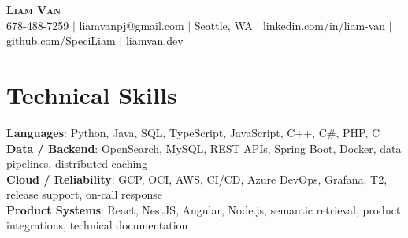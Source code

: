 \documentclass[letterpaper,11pt]{article}
\begin{document}

%
\begin{center}
    \textbf{\Huge \scshape Liam Van} \\ \vspace{1pt}
    \small 678-488-7259 $|$ \small {liamvanpj@gmail.com} $|$ Seattle, WA
 {{$|$ linkedin.com/in/liam-van} {$|$ github.com/SpeciLiam} {$|$ \href{https://liamvan.dev}{liamvan.dev}}}

\end{center}

\section{Technical Skills}
 \begin{itemize}[leftmargin=0.15in, label={}]
    \small{\item{
     \textbf{Languages}{: Python, Java, SQL, TypeScript, JavaScript, C++, C\#, PHP, C} \\
     \textbf{Data / Backend}{: OpenSearch, MySQL, REST APIs, Spring Boot, Docker, data pipelines, distributed caching} \\
     \textbf{Cloud / Reliability}{: GCP, OCI, AWS, CI/CD, Azure DevOps, Grafana, T2, release support, on-call response} \\
     \textbf{Product Systems}{: React, NestJS, Angular, Node.js, semantic retrieval, product integrations, technical documentation} \\
    }}
 \end{itemize}
%

\end{document}
